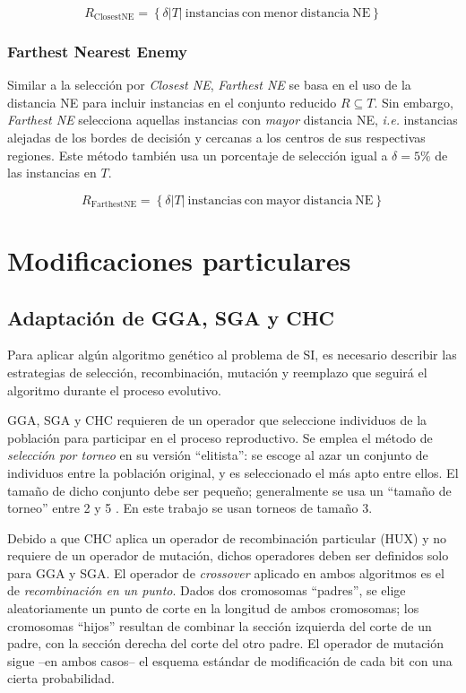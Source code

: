 \begin{equation}
R_\mathrm{ClosestNE} = \left\lbrace \delta \vert T \vert\ \mathrm{instancias\ con\ menor\ distancia\ NE} \right\rbrace
\end{equation}

\subsubsection{Farthest Nearest Enemy}

Similar a la selección por \emph{Closest NE}, \emph{Farthest NE} se basa en el uso de la distancia NE para incluir instancias en el conjunto reducido $R \subseteq T$. Sin embargo, \emph{Farthest NE} selecciona aquellas instancias con \emph{mayor} distancia NE, \emph{i.e.} instancias alejadas de los bordes de decisión y cercanas a los centros de sus respectivas regiones. Este método también usa un porcentaje de selección igual a $\delta = 5\%$ de las instancias en $T$.

\begin{equation}
R_\mathrm{FarthestNE} = \left\lbrace \delta \vert T \vert\ \mathrm{instancias\ con\ mayor\ distancia\ NE} \right\rbrace
\end{equation}

\section{Modificaciones particulares}

\subsection{Adaptación de GGA, SGA y CHC}

Para aplicar algún algoritmo genético al problema de SI, es necesario describir las estrategias de selección, recombinación, mutación y reemplazo que seguirá el algoritmo durante el proceso evolutivo.

GGA, SGA y CHC requieren de un operador que seleccione individuos de la población para participar en el proceso reproductivo. Se emplea el método de \emph{selección por torneo} en su versión ``elitista'': se escoge al azar un conjunto de individuos entre la población original, y es seleccionado el más apto entre ellos. El tamaño de dicho conjunto debe ser pequeño; generalmente se usa un ``tamaño de torneo'' entre 2 y 5 \cite{Miller95geneticalgorithms}. En este trabajo se usan torneos de tamaño 3.

Debido a que CHC aplica un operador de recombinación particular (HUX) y no requiere de un operador de mutación, dichos operadores deben ser definidos solo para GGA y SGA. El operador de \emph{crossover} aplicado en ambos algoritmos es el de \emph{recombinación en un punto}. Dados dos cromosomas ``padres'', se elige aleatoriamente un punto de corte en la longitud de ambos cromosomas; los cromosomas ``hijos'' resultan de combinar la sección izquierda del corte de un padre, con la sección derecha del corte del otro padre. El operador de mutación sigue --en ambos casos-- el esquema estándar de modificación de cada bit con una cierta probabilidad.

